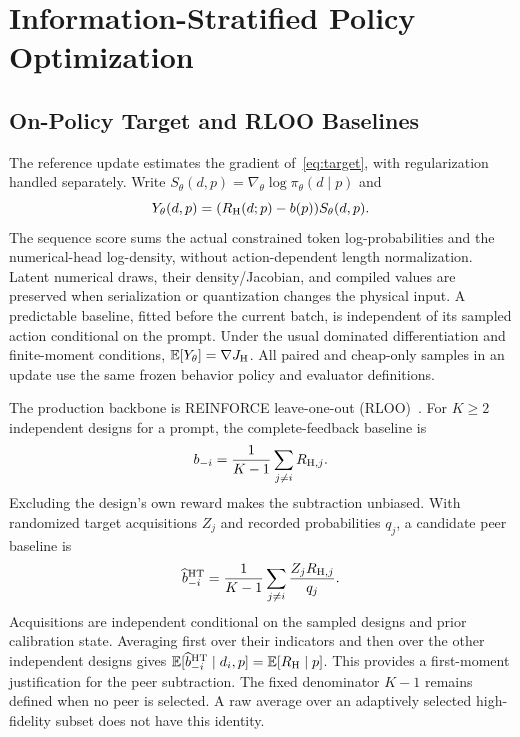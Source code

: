 \section{Information-Stratified Policy Optimization}
\subsection{On-Policy Target and RLOO Baselines}
The reference update estimates the gradient of~\eqref{eq:target}, with regularization handled separately. Write $S_\theta(d,p)=\nabla_\theta\log\pi_\theta(d\mid p)$ and
\begin{equation}
Y_\theta(d,p)=(R_{\mathrm{H}}(d;p)-b(p))S_\theta(d,p).
\label{eq:reference-gradient}
\end{equation}
The sequence score sums the actual constrained token log-probabilities and the numerical-head log-density, without action-dependent length normalization. Latent numerical draws, their density/Jacobian, and compiled values are preserved when serialization or quantization changes the physical input. A predictable baseline, fitted before the current batch, is independent of its sampled action conditional on the prompt. Under the usual dominated differentiation and finite-moment conditions, $\mathbb{E}[Y_\theta]=\nabla J_{\mathrm{H}}$. All paired and cheap-only samples in an update use the same frozen behavior policy and evaluator definitions.

The production backbone is REINFORCE leave-one-out (RLOO)~\cite{ahmadian2024rloo}. For $K\ge2$ independent designs for a prompt, the complete-feedback baseline is
\begin{equation}
b_{-i}=\frac{1}{K-1}\sum_{j\ne i}R_{\mathrm{H},j}.
\label{eq:rloo-peer}
\end{equation}
Excluding the design's own reward makes the subtraction unbiased. With randomized target acquisitions $Z_j$ and recorded probabilities $q_j$, a candidate peer baseline is
\begin{equation}
\widehat b_{-i}^{\rm HT}=\frac{1}{K-1}\sum_{j\ne i}\frac{Z_j R_{\mathrm{H},j}}{q_j}.
\label{eq:ht-peer}
\end{equation}
Acquisitions are independent conditional on the sampled designs and prior calibration state. Averaging first over their indicators and then over the other independent designs gives $\mathbb{E}[\widehat b_{-i}^{\rm HT}\mid d_i,p]=\mathbb{E}[R_{\mathrm{H}}\mid p]$. This provides a first-moment justification for the peer subtraction. The fixed denominator $K-1$ remains defined when no peer is selected. A raw average over an adaptively selected high-fidelity subset does not have this identity.

